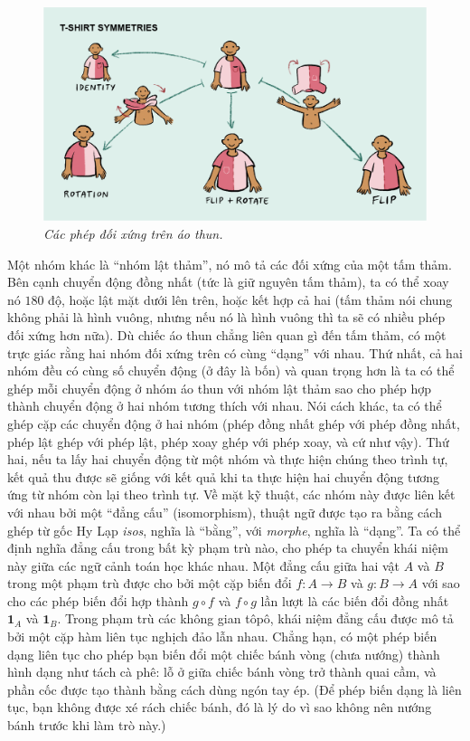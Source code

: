 \begin{multicols}{2}
	\begin{figure}[H]
		\centering
		\vspace*{-5pt}
		\captionsetup{labelformat= empty, justification=centering}
		\includegraphics[width=1\linewidth]{5}
		\caption{\small\textit{\color{duongvaotoanhoc}Các phép đối xứng trên áo thun.}}
		\vspace*{-10pt}
	\end{figure}
	Một nhóm khác là ``nhóm lật thảm'', nó mô tả các đối xứng của một tấm thảm. Bên cạnh chuyển động đồng nhất (tức là giữ nguyên tấm thảm), ta có thể xoay nó $180$ độ, hoặc lật mặt dưới lên trên, hoặc kết hợp cả hai (tấm thảm nói chung không phải là hình vuông, nhưng nếu nó là hình vuông thì ta sẽ có nhiều phép đối xứng hơn nữa). Dù chiếc áo thun chẳng liên quan gì đến tấm thảm, có một trực giác rằng hai nhóm đối xứng trên có cùng ``dạng'' với nhau. Thứ nhất, cả hai nhóm đều có cùng số chuyển động (ở đây là bốn) và quan trọng hơn là ta có thể ghép mỗi chuyển động ở nhóm áo thun với nhóm lật thảm sao cho phép hợp thành chuyển động ở hai nhóm tương thích với nhau. Nói cách khác, ta có thể ghép cặp các chuyển động ở hai nhóm (phép đồng nhất ghép với phép đồng nhất, phép lật ghép với phép lật, phép xoay ghép với phép xoay, và cứ như vậy). Thứ hai, nếu ta lấy hai chuyển động từ một nhóm và thực hiện chúng theo trình tự, kết quả thu được sẽ giống với kết quả khi ta thực hiện hai chuyển động tương ứng từ nhóm còn lại theo trình tự. Về mặt kỹ thuật, các nhóm này được liên kết với nhau bởi một ``đẳng cấu'' (isomorphism), thuật ngữ được tạo ra bằng cách ghép từ gốc Hy Lạp \emph{isos}, nghĩa là ``bằng'', với \emph{morphe}, nghĩa là ``dạng''.
	\vskip 0.1cm
	Ta có thể định nghĩa đẳng cấu trong bất kỳ phạm trù nào, cho phép ta chuyển khái niệm này giữa các ngữ cảnh toán học khác nhau. Một đẳng cấu giữa hai vật $A$ và $B$ trong một phạm trù được cho bởi một cặp biến đổi $f: A \to B$ và $g: B \to A$ với sao cho các phép biến đổi hợp thành $g \circ f$ và $f \circ g$ lần lượt là các biến đổi đồng nhất $\pmb{1}_A$ và $\pmb{1}_B$. Trong phạm trù các không gian tôpô, khái niệm đẳng cấu được mô tả bởi một cặp hàm liên tục nghịch đảo lẫn nhau. Chẳng hạn, có một phép biến dạng liên tục cho phép bạn biến đổi một chiếc bánh vòng (chưa nướng) thành hình dạng như tách cà phê: lỗ ở giữa chiếc bánh vòng trở thành quai cầm, và phần cốc được tạo thành bằng cách dùng ngón tay ép. (Để phép biến dạng là liên tục, bạn không được xé rách chiếc bánh, đó là lý do vì sao không nên nướng bánh trước khi làm trò này.)

\end{multicols}
